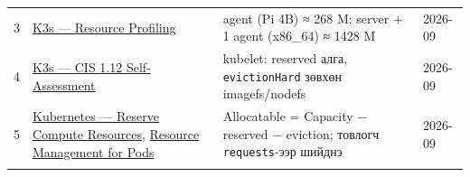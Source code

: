 \begin{longtable}[]{@{}llll@{}}
\begin{minipage}[t]{0.22\columnwidth}\raggedright
3\strut
\end{minipage} & \begin{minipage}[t]{0.22\columnwidth}\raggedright
\href{https://docs.k3s.io/reference/resource-profiling}{K3s --- Resource Profiling}\strut
\end{minipage} & \begin{minipage}[t]{0.22\columnwidth}\raggedright
agent (Pi 4B) ≈ 268 M; server + 1 agent (x86\_64) ≈ 1428 M\strut
\end{minipage} & \begin{minipage}[t]{0.22\columnwidth}\raggedright
2026-09\strut
\end{minipage}\tabularnewline
\begin{minipage}[t]{0.22\columnwidth}\raggedright
4\strut
\end{minipage} & \begin{minipage}[t]{0.22\columnwidth}\raggedright
\href{https://docs.k3s.io/security/self-assessment-1.12}{K3s --- CIS 1.\allowbreak{}12 Self-Assessment}\strut
\end{minipage} & \begin{minipage}[t]{0.22\columnwidth}\raggedright
kubelet: reserved алга, \texttt{evictionHard} зөвхөн imagefs/nodefs\strut
\end{minipage} & \begin{minipage}[t]{0.22\columnwidth}\raggedright
2026-09\strut
\end{minipage}\tabularnewline
\begin{minipage}[t]{0.22\columnwidth}\raggedright
5\strut
\end{minipage} & \begin{minipage}[t]{0.22\columnwidth}\raggedright
\href{https://kubernetes.io/docs/tasks/administer-cluster/reserve-compute-resources/}{Kubernetes --- Reserve Compute Resources}, \href{https://kubernetes.io/docs/concepts/configuration/manage-resources-containers/}{Resource Management for Pods}\strut
\end{minipage} & \begin{minipage}[t]{0.22\columnwidth}\raggedright
Allocatable = Capacity − reserved − eviction; товлогч \texttt{requests}-ээр шийднэ\strut
\end{minipage} & \begin{minipage}[t]{0.22\columnwidth}\raggedright
2026-09\strut
\end{minipage}\tabularnewline
\begin{minipage}[t]{0.22\columnwidth}\raggedright

\end{minipage}
\end{longtable}
